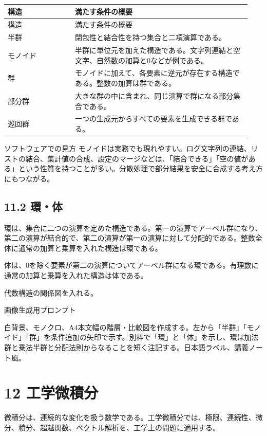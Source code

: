 \documentclass[uplatex,dvipdfmx,a4paper,10pt]{jsarticle}
\begin{document}
\begin{longtable}{>{\raggedright\arraybackslash}p{0.26\linewidth} >{\raggedright\arraybackslash}p{0.68\linewidth}}
\toprule
構造 & 満たす条件の概要 \\
\midrule
\endfirsthead
\toprule
構造 & 満たす条件の概要 \\
\midrule
\endhead
半群 & 閉包性と結合性を持つ集合と二項演算である。 \\
モノイド & 半群に単位元を加えた構造である。文字列連結と空文字、自然数の加算と0などが例である。 \\
群 & モノイドに加えて、各要素に逆元が存在する構造である。整数の加算は群である。 \\
部分群 & 大きな群の中に含まれ、同じ演算で群になる部分集合である。 \\
巡回群 & 一つの生成元からすべての要素を生成できる群である。 \\
\bottomrule
\end{longtable}
\begin{infobox}{ソフトウェアでの見方}
モノイドは実務でも現れやすい。ログ文字列の連結、リストの結合、集計値の合成、設定のマージなどは、「結合できる」「空の値がある」という性質を持つことが多い。分散処理で部分結果を安全に合成する考え方にもつながる。
\end{infobox}
\subsection{11.2 環・体}
環は、集合に二つの演算を定めた構造である。第一の演算でアーベル群になり、第二の演算が結合的で、第二の演算が第一の演算に対して分配的である。整数全体に通常の加算と乗算を入れた構造は環である。

体は、0を除く要素が第二の演算についてアーベル群になる環である。有理数に通常の加算と乗算を入れた構造は体である。

\begin{todobox}
代数構造の関係図を入れる。

画像生成用プロンプト

白背景、モノクロ、A4本文幅の階層・比較図を作成する。左から「半群」「モノイド」「群」を条件追加の矢印で示す。別枠で「環」と「体」を示し、環は加法群と乗法半群と分配法則からなることを短く注記する。日本語ラベル、講義ノート風。
\end{todobox}
\section{12 工学微積分}
微積分は、連続的な変化を扱う数学である。工学微積分では、極限、連続性、微分、積分、超越関数、ベクトル解析を、工学上の問題に適用する。
\end{document}
